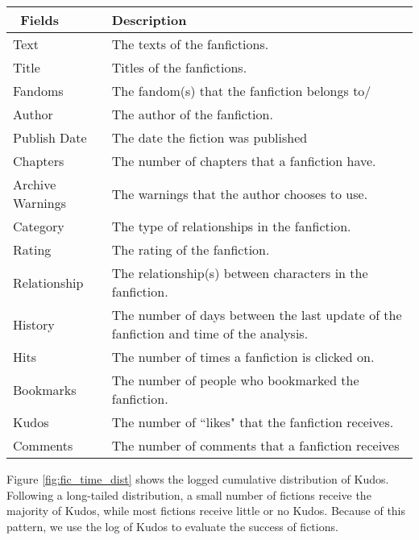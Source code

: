 \documentclass[a4paper]{article}
\begin{document}
\begin{table}
\centering
\begin{tabular}[width=0.8\textwidth]{p{2cm}p{10cm}}
\toprule
\ Fields & Description \\ 
   \hline			
Text & The texts of the fanfictions. \\
Title & Titles of the fanfictions.  \\
Fandoms & The fandom(s) that the fanfiction belongs to/ \\
Author & The author of the fanfiction.  \\
Publish Date & The date the fiction was published \\
Chapters & The number of chapters that a fanfiction have. \\
Archive Warnings & The warnings that the author chooses to use. \\
Category & The type of relationships in the fanfiction. \\
Rating & The rating of the fanfiction. \\
Relationship & The relationship(s) between characters in the fanfiction. \\
History & The number of days between the last update of the fanfiction and time of the analysis. \\
\hline
Hits & The number of times a fanfiction is clicked on. \\
Bookmarks & The number of people who bookmarked the fanfiction.\\
Kudos & The number of ``likes" that the fanfiction receives. \\
Comments & The number of comments that a fanfiction receives\\


\bottomrule
\end{tabular}
\label{tab:metadata}
\end{table}%



Figure \ref{fig:fic_time_dist} shows the logged cumulative distribution of Kudos. Following a long-tailed distribution, a small number of fictions receive the majority of Kudos, while most fictions receive little or no Kudos. Because of this pattern, we use the log of Kudos to evaluate the success of fictions. 
\end{document}
